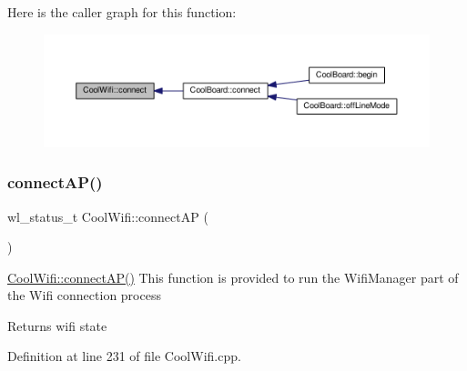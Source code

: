 Here is the caller graph for this function\+:\nopagebreak
\begin{figure}[H]
\begin{center}
\leavevmode
\includegraphics[width=350pt]{d7/d29/class_cool_wifi_ad060353050f40d032a2dbf9e54a768bf_icgraph}
\end{center}
\end{figure}
\mbox{\label{class_cool_wifi_a7c857f27161782f5ef1d62d552aff971}} 
\subsubsection{\texorpdfstring{connect\+A\+P()}{connectAP()}}
{\footnotesize\ttfamily wl\+\_\+status\+\_\+t Cool\+Wifi\+::connect\+AP (\begin{DoxyParamCaption}{ }\end{DoxyParamCaption})}

\hyperlink{class_cool_wifi_a7c857f27161782f5ef1d62d552aff971}{Cool\+Wifi\+::connect\+A\+P()} This function is provided to run the Wifi\+Manager part of the Wifi connection process

\begin{DoxyReturn}{Returns}
wifi state 
\end{DoxyReturn}


Definition at line 231 of file Cool\+Wifi.\+cpp.


